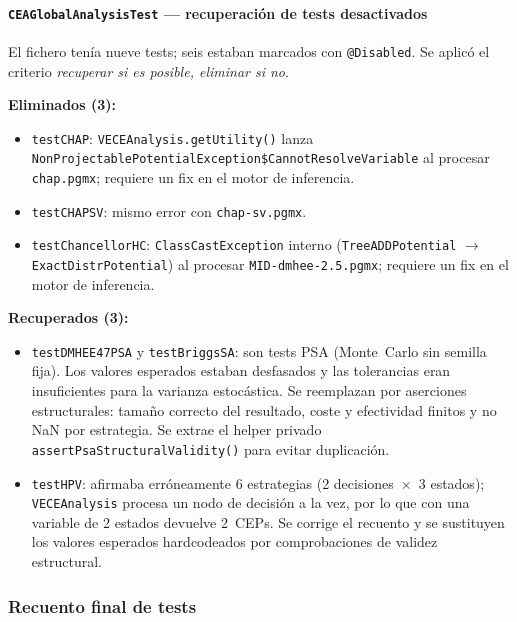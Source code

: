 \documentclass[11pt,a4paper]{article}
\newcommand{\code}[1]{\texttt{#1}}
\begin{document}
\paragraph{\code{CEAGlobalAnalysisTest} --- recuperación de tests desactivados}
El fichero tenía nueve tests; seis estaban marcados con \code{@Disabled}.
Se aplicó el criterio \emph{recuperar si es posible, eliminar si no}.

\medskip
\noindent\textbf{Eliminados (3):}
\begin{itemize}
  \item \code{testCHAP}: \code{VECEAnalysis.\-getUtility()} lanza
        \code{Non\-Projectable\-Potential\-Exception\$\-Cannot\-Resolve\-Variable} al
        procesar \texttt{chap.pgmx}; requiere un fix en el motor de inferencia.
  \item \code{testCHAPSV}: mismo error con \texttt{chap-sv.pgmx}.
  \item \code{testChancellorHC}: \code{ClassCastException} interno
        (\code{Tree\-ADD\-Potential} $\to$ \code{Exact\-Distr\-Potential}) al procesar
        \texttt{MID-dmhee-2.5.pgmx}; requiere un fix en el motor de inferencia.
\end{itemize}

\medskip
\noindent\textbf{Recuperados (3):}
\begin{itemize}
  \item \code{testDMHEE47PSA} y \code{testBriggsSA}: son tests PSA
        (Monte~Carlo sin semilla fija).  Los valores esperados estaban desfasados
        y las tolerancias eran insuficientes para la varianza estocástica.  Se
        reemplazan por aserciones estructurales: tamaño correcto del resultado,
        coste y efectividad finitos y no NaN por estrategia.  Se extrae el helper
        privado \code{assertPsaStructuralValidity()} para evitar duplicación.
  \item \code{testHPV}: afirmaba erróneamente 6 estrategias (2
        decisiones~$\times$~3 estados); \code{VECEAnalysis} procesa un nodo de
        decisión a la vez, por lo que con una variable de 2 estados devuelve
        2~CEPs.  Se corrige el recuento y se sustituyen los valores esperados
        hardcodeados por comprobaciones de validez estructural.
\end{itemize}

\subsubsection*{Recuento final de tests}
\end{document}
